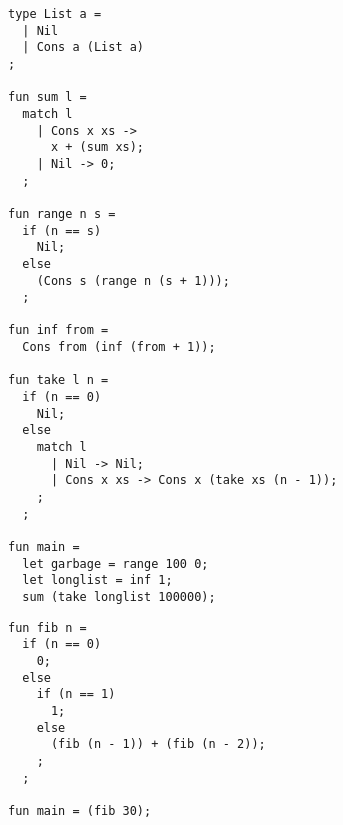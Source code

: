 
\begin{figure}
\begin{lstlisting}[breaklines=true,caption={A program that sums a list of 100000 increasing integers},label=lst:appedix:intsum]
type List a = 
  | Nil
  | Cons a (List a)
;

fun sum l =
  match l
    | Cons x xs ->
      x + (sum xs);
    | Nil -> 0;
  ;

fun range n s =
  if (n == s) 
    Nil;
  else
    (Cons s (range n (s + 1)));
  ;

fun inf from =
  Cons from (inf (from + 1));

fun take l n =
  if (n == 0) 
    Nil;
  else
    match l
      | Nil -> Nil;
      | Cons x xs -> Cons x (take xs (n - 1));
    ;
  ;

fun main =
  let garbage = range 100 0;
  let longlist = inf 1;
  sum (take longlist 100000);
\end{lstlisting}
\end{figure}
\begin{figure}
\begin{lstlisting}[breaklines=true,caption={A program which calculates the Fibonacci numbers recursively},label=lst:appedix:fib]
fun fib n = 
  if (n == 0)
    0;
  else
    if (n == 1)
      1;
    else
      (fib (n - 1)) + (fib (n - 2));
    ;
  ;

fun main = (fib 30);
\end{lstlisting}
\end{figure}
